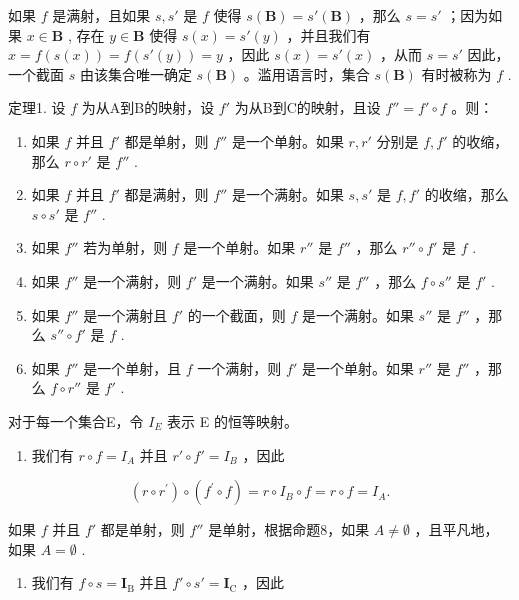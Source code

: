 如果 \(f\) 是满射，且如果 \(s, s'\) 是 \(f\) 使得 \(s(\mathbf{B}) = s'(\mathbf{B})\) ，那么 \(s = s'\) ；因为如果 \(x \in \mathbf{B}\) , 存在 \(y \in \mathbf{B}\) 使得 \(s(x) = s'(y)\) ，并且我们有 \(x = f(s(x)) = f(s'(y)) = y\) ，因此 \(s(x) = s'(x)\) ，从而 \(s = s'\) 因此，一个截面 \(s\) 由该集合唯一确定 \(s(\mathbf{B})\) 。滥用语言时，集合 \(s(\mathbf{B})\) 有时被称为 \(f\) .

定理1. 设 \(f\) 为从A到B的映射，设 \(f'\) 为从B到C的映射，且设 \(f'' = f' \circ f\) 。则：

\begin{enumerate}
\def\labelenumi{(\alph{enumi})}
\item
  如果 \(f\) 并且 \(f'\) 都是单射，则 \(f''\) 是一个单射。如果 \(r, r'\) 分别是 \(f, f'\) 的收缩，那么 \(r \circ r'\) 是 \(f''\) .
\item
  如果 \(f\) 并且 \(f'\) 都是满射，则 \(f''\) 是一个满射。如果 \(s, s'\) 是 \(f, f'\) 的收缩，那么 \(s \circ s'\) 是 \(f''\) .
\item
  如果 \(f''\) 若为单射，则 \(f\) 是一个单射。如果 \(r''\) 是 \(f''\) ，那么 \(r'' \circ f'\) 是 \(f\) .
\item
  如果 \(f''\) 是一个满射，则 \(f'\) 是一个满射。如果 \(s''\) 是 \(f''\) ，那么 \(f \circ s''\) 是 \(f'\) .
\item
  如果 \(f''\) 是一个满射且 \(f'\) 的一个截面，则 \(f\) 是一个满射。如果 \(s''\) 是 \(f''\) ，那么 \(s'' \circ f'\) 是 \(f\) .
\item
  如果 \(f''\) 是一个单射，且 \(f\) 一个满射，则 \(f'\) 是一个单射。如果 \(r''\) 是 \(f''\) ，那么 \(f \circ r''\) 是 \(f'\) .
\end{enumerate}

对于每一个集合E，令 \(I_{E}\) 表示 E 的恒等映射。

\begin{enumerate}
\def\labelenumi{(\alph{enumi})}
\tightlist
\item
  我们有 \(r \circ f = I_A\) 并且 \(r' \circ f' = I_B\) ，因此
\end{enumerate}

\[
\left(r \circ r ^ {\prime}\right) \circ \left(f ^ {\prime} \circ f\right) = r \circ I _ {B} \circ f = r \circ f = I _ {A}.
\]

如果 \(f\) 并且 \(f'\) 都是单射，则 \(f''\) 是单射，根据命题8，如果 \(A \neq \emptyset\) ，且平凡地，如果 \(A = \emptyset\) .

\begin{enumerate}
\def\labelenumi{(\alph{enumi})}
\setcounter{enumi}{1}
\tightlist
\item
  我们有 \(f \circ s = \mathbf{I}_{\mathrm{B}}\) 并且 \(f' \circ s' = \mathbf{I}_{\mathrm{C}}\) ，因此
\end{enumerate}

